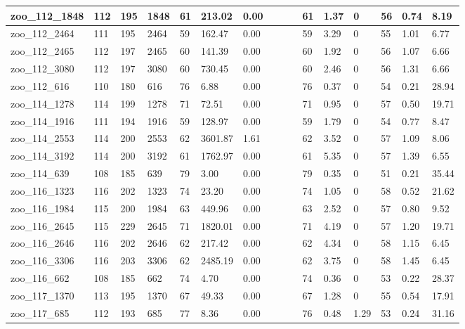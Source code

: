 \begin{landscape}
\begin{longtable}{llllllllllllllll}
zoo\_112\_1848 & 112 & 195 & 1848 & 61 & 213.02 & 0.00 &  &  &  & 61 & 1.37 & 0 & 56 & 0.74 & 8.19 \\ \hline 
zoo\_112\_2464 & 111 & 195 & 2464 & 59 & 162.47 & 0.00 &  &  &  & 59 & 3.29 & 0 & 55 & 1.01 & 6.77 \\ \hline 
zoo\_112\_2465 & 112 & 197 & 2465 & 60 & 141.39 & 0.00 &  &  &  & 60 & 1.92 & 0 & 56 & 1.07 & 6.66 \\ \hline 
zoo\_112\_3080 & 112 & 197 & 3080 & 60 & 730.45 & 0.00 &  &  &  & 60 & 2.46 & 0 & 56 & 1.31 & 6.66 \\ \hline 
zoo\_112\_616 & 110 & 180 & 616 & 76 & 6.88 & 0.00 &  &  &  & 76 & 0.37 & 0 & 54 & 0.21 & 28.94 \\ \hline 
zoo\_114\_1278 & 114 & 199 & 1278 & 71 & 72.51 & 0.00 &  &  &  & 71 & 0.95 & 0 & 57 & 0.50 & 19.71 \\ \hline 
zoo\_114\_1916 & 111 & 194 & 1916 & 59 & 128.97 & 0.00 &  &  &  & 59 & 1.79 & 0 & 54 & 0.77 & 8.47 \\ \hline 
zoo\_114\_2553 & 114 & 200 & 2553 & 62 & 3601.87 & 1.61 &  &  &  & 62 & 3.52 & 0 & 57 & 1.09 & 8.06 \\ \hline 
zoo\_114\_3192 & 114 & 200 & 3192 & 61 & 1762.97 & 0.00 &  &  &  & 61 & 5.35 & 0 & 57 & 1.39 & 6.55 \\ \hline 
zoo\_114\_639 & 108 & 185 & 639 & 79 & 3.00 & 0.00 &  &  &  & 79 & 0.35 & 0 & 51 & 0.21 & 35.44 \\ \hline 
zoo\_116\_1323 & 116 & 202 & 1323 & 74 & 23.20 & 0.00 &  &  &  & 74 & 1.05 & 0 & 58 & 0.52 & 21.62 \\ \hline 
zoo\_116\_1984 & 115 & 200 & 1984 & 63 & 449.96 & 0.00 &  &  &  & 63 & 2.52 & 0 & 57 & 0.80 & 9.52 \\ \hline 
zoo\_116\_2645 & 115 & 229 & 2645 & 71 & 1820.01 & 0.00 &  &  &  & 71 & 4.19 & 0 & 57 & 1.20 & 19.71 \\ \hline 
zoo\_116\_2646 & 116 & 202 & 2646 & 62 & 217.42 & 0.00 &  &  &  & 62 & 4.34 & 0 & 58 & 1.15 & 6.45 \\ \hline 
zoo\_116\_3306 & 116 & 203 & 3306 & 62 & 2485.19 & 0.00 &  &  &  & 62 & 3.75 & 0 & 58 & 1.45 & 6.45 \\ \hline 
zoo\_116\_662 & 108 & 185 & 662 & 74 & 4.70 & 0.00 &  &  &  & 74 & 0.36 & 0 & 53 & 0.22 & 28.37 \\ \hline 
zoo\_117\_1370 & 113 & 195 & 1370 & 67 & 49.33 & 0.00 &  &  &  & 67 & 1.28 & 0 & 55 & 0.54 & 17.91 \\ \hline 
zoo\_117\_685 & 112 & 193 & 685 & 77 & 8.36 & 0.00 &  &  &  & 76 & 0.48 & 1.29 & 53 & 0.24 & 31.16 \\ \hline 

\end{longtable}
\end{landscape}

